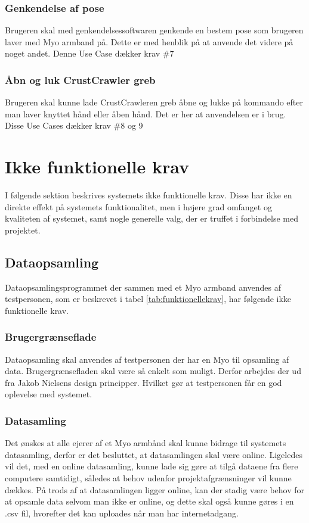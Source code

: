\subsubsection{Genkendelse af pose}
Brugeren skal med genkendelsessoftwaren genkende en bestem pose som brugeren laver med Myo armband på. Dette er med henblik på at anvende det videre på noget andet. Denne Use Case dækker krav \#7
\subsubsection{Åbn og luk CrustCrawler greb}
Brugeren skal kunne lade CrustCrawleren greb åbne og lukke på kommando efter man laver knyttet hånd eller åben hånd. Det er her at anvendelsen er i brug. Disse Use Cases dækker krav \#8 og 9

\section{Ikke funktionelle krav}
\label{sec:ikkefunktionellekrav}
I følgende sektion beskrives systemets ikke funktionelle krav. Disse har ikke en direkte effekt på systemets funktionalitet, men i højere grad omfanget og kvaliteten af systemet, samt nogle generelle valg, der er truffet i forbindelse med projektet.

\subsection{Dataopsamling}
Dataopsamlingsprogrammet der sammen med et Myo armband anvendes af testpersonen, som er beskrevet i tabel \ref{tab:funktionellekrav}, har følgende ikke funktionelle krav.

\subsubsection{Brugergrænseflade}
Dataopsamling skal anvendes af testpersonen der har en Myo til opsamling af data. Brugergrænsefladen skal være så enkelt som muligt.  Derfor arbejdes der ud fra Jakob Nielsens design principper. Hvilket gør at testpersonen får en god oplevelse med systemet.

\subsubsection{Datasamling}
Det ønskes at alle ejerer af et Myo armbånd skal kunne bidrage til systemets datasamling, derfor er det besluttet, at datasamlingen skal være online. Ligeledes vil det, med en online datasamling, kunne lade sig gøre at tilgå dataene fra flere computere samtidigt, således at behov udenfor projektafgrænsninger vil kunne dækkes. På trods af at datasamlingen ligger online, kan der stadig være behov for at opsamle data selvom man ikke er online, og dette skal også kunne gøres i en .csv fil, hvorefter det kan uploades når man har internetadgang.


